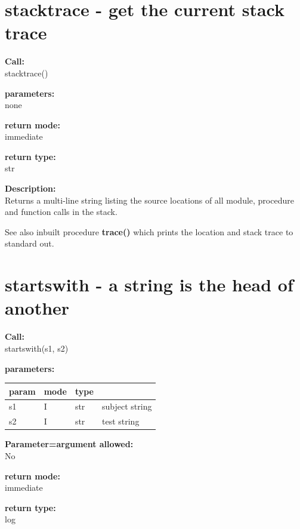     \section{stacktrace - get the current stack trace}\label{sec:ifstacktrace}
        
        {\bf Call:} \\
        stacktrace()
        
        {\bf parameters:} \\
        none
        
        {\bf return mode:} \\
        immediate

        {\bf return type:} \\
        str
        
        {\bf Description:} \\
        Returns a multi-line string listing the source locations of
        all module, procedure and function calls in the stack.
        
        See also inbuilt procedure {\bf trace()} 
        which prints the location and stack trace to standard out.


    \section{startswith - a string is the head of another}\label{sec:ifstartswith}
        
        {\bf Call:} \\
        startswith(s1, s2)
        
        {\bf parameters:} \\
        \begin{tabular}{| l | l | l | l |}
        \hline
        param  & mode & type & \\
        \hline \hline
        s1 & I & str & subject string   \\ \hline
        s2 & I & str & test string      \\ \hline
        \end{tabular}
        
        {\bf Parameter=argument allowed:} \\
        No
        
        {\bf return mode:} \\
        immediate

        {\bf return type:} \\
        log
        

